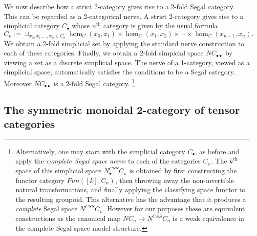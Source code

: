 \documentclass{amsart}
\begin{document}
We now describe how a strict 2-category gives rise to a 2-fold Segal category. This can be regarded as a 2-categorical nerve. %
A strict 2-category gives rise to a simplicial category $C_\bullet$ whose $n^\textrm{th}$ category is given by the usual formula
\begin{equation*}
	C_n := \sqcup_{x_0, x_1, \dots, x_n \in C_0} \hom_C(x_0, x_1) \times \hom_C(x_1, x_2) \times \cdots \times \hom_C(x_{n-1}, x_n).
\end{equation*}
We obtain a 2-fold simplicial set by applying the standard nerve construction to each of these categories. Finally, we obtain a 2-fold simplcial space $NC_{\bullet \bullet}$ by viewing a set as a discrete simplicial space. The nerve of a 1-category, viewed as a simplicial space, automatically satisfies the conditions to be a Segal category. Moreover $NC_{\bullet \bullet}$ is a 2-fold Segal category. 
\footnote{Alternatively, one may start with the simplicial category $C_\bullet$, as before and apply the {\em complete Segal space nerve} to each of the categories $C_n$. The $k^\text{th}$ space of this simplicial space $N^{CSS}_\bullet C_n$ is obtained by first constructing the functor category $Fun([k], C_n)$, then throwing away the non-invertible natural transformations, and finally applying the classifying space functor to the resulting groupoid. This alternative has the advantage that it produces a {\em complete} Segal space $N^{CSS} C_n$. However for our purposes these are equivalent constructions as the canonical map $N C_n \to N^{CSS} C_n$ is a weak equivalence in the complete Segal space model structure. 
}




\subsection{The symmetric monoidal 2-category of tensor categories} \label{sec-tc-threecat}
\end{document}
